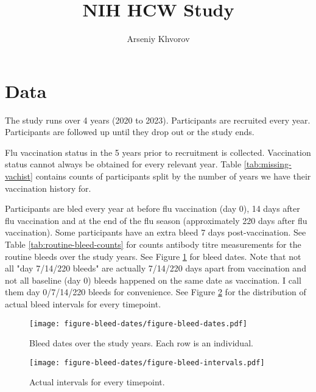 \documentclass[12pt]{article}
\title{NIH HCW Study}
\author{Arseniy Khvorov}
\begin{document}
\maketitle

\section{Data}

The study runs over 4 years (2020 to 2023). 
Participants are recruited every year.
Participants are followed up until they drop out or the study ends.

Flu vaccination status in the 5 years prior to recruitment is collected. Vaccination status cannot always be obtained for every relevant year. Table \ref{tab:missing-vachist} contains counts of participants split by the number of years we have their vaccination history for.



Participants are bled every year at before flu vaccination (day 0), 14 days after flu vaccination and at the end of the flu season (approximately 220 days after flu vaccination). 
Some participants have an extra bleed 7 days post-vaccination.
See Table \ref{tab:routine-bleed-counts} for counts antibody titre measurements for the routine bleeds over the study years. 
See Figure \ref{fig:bleed-dates} for bleed dates.
Note that not all "day 7/14/220 bleeds" are actually 7/14/220 days apart from vaccination and not all baseline (day 0) bleeds happened on the same date as vaccination.
I call them day 0/7/14/220 bleeds for convenience.
See Figure \ref{fig:bleed-intervals} for the distribution of actual bleed intervals for every timepoint.



\begin{figure}
	\texttt{[image: figure-bleed-dates/figure-bleed-dates.pdf]}
	\caption{Bleed dates over the study years. Each row is an individual.}
	\label{fig:bleed-dates}
\end{figure}

\begin{figure}
	\texttt{[image: figure-bleed-dates/figure-bleed-intervals.pdf]}
	\caption{Actual intervals for every timepoint.}
	\label{fig:bleed-intervals}
\end{figure}
\end{document}
